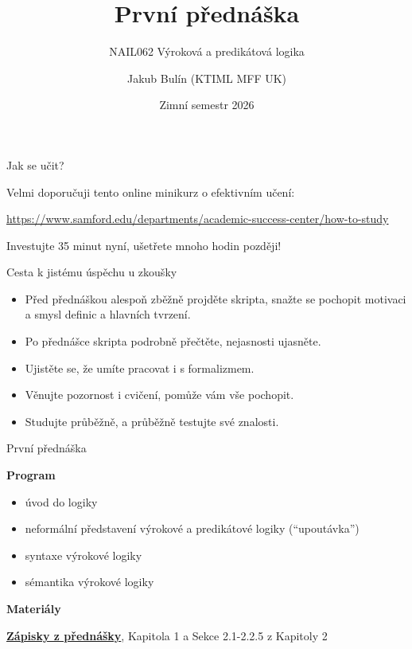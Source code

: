 \documentclass{beamer}
\title{První přednáška}
\subtitle{NAIL062 Výroková a predikátová logika}
\author{Jakub Bulín (KTIML MFF UK)}
\date{Zimní semestr 2026}
\begin{document}
\maketitle


\begin{frame}{Jak se učit?}

    Velmi doporučuji tento online minikurz o efektivním učení:


    \href{https://www.samford.edu/departments/academic-success-center/how-to-study}{\alert{https://www.samford.edu/departments/academic-success-center/how-to-study}}

    Investujte 35 minut nyní, ušetřete mnoho hodin později!
    
\end{frame}


\begin{frame}{Cesta k jistému úspěchu u zkoušky}

    \begin{itemize}    
        \item \alert{Před přednáškou} alespoň zběžně projděte skripta, snažte se pochopit motivaci a smysl definic a hlavních tvrzení.
        \item Po přednášce skripta \alert{podrobně přečtěte}, nejasnosti ujasněte.
        \item Ujistěte se, že umíte pracovat i s \alert{formalizmem}.
        \item Věnujte pozornost i \alert{cvičení}, pomůže vám vše pochopit.
        \item Studujte \alert{průběžně}, a průběžně \alert{testujte své znalosti}.
    \end{itemize}

\end{frame}


\begin{frame}{První přednáška}

    \textbf{Program}
        \begin{itemize}
            \item úvod do logiky
            \item neformální představení výrokové a predikátové logiky (``upoutávka'')
            \item syntaxe výrokové logiky
            \item sémantika výrokové logiky
        \end{itemize}

    \textbf{Materiály}

        \href{https://github.com/jbulin-mff-uk/nail062/raw/main/lecture/lecture-notes/lecture-notes.pdf}{\alert{\textbf{Zápisky z přednášky}}}, Kapitola 1 a Sekce 2.1-2.2.5 z Kapitoly 2

\end{frame}
\end{document}
